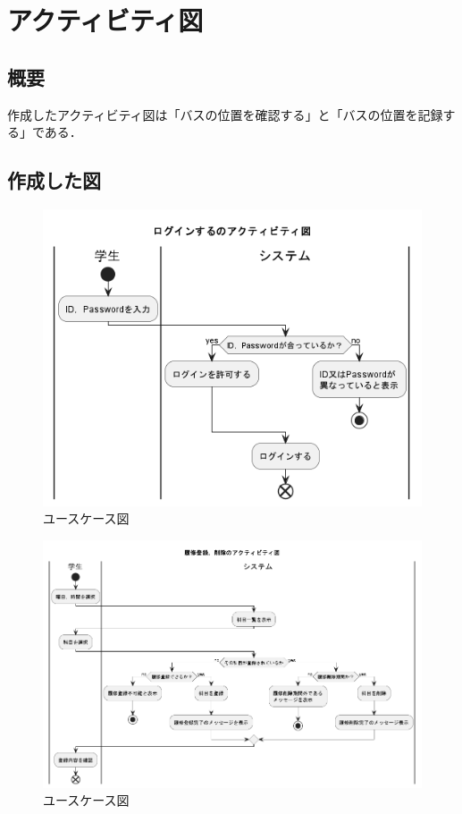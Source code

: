 \documentclass[documentclass]{jsarticle}
\begin{document}
\newpage

\section{アクティビティ図}
\subsection*{概要}
作成したアクティビティ図は「バスの位置を確認する」と「バスの位置を記録する」である．


\subsection*{作成した図}
\begin{figure}[H]
  \begin{center}
    \includegraphics*[scale=0.4]{figure/7-1.png}
  \end{center}
  \caption{ユースケース図}
  \label{fig:7-1}
\end{figure}

\begin{figure}[H]
  \begin{center}
    \includegraphics*[scale=0.4]{figure/7-2.png}
  \end{center}
  \caption{ユースケース図}
  \label{fig:7-2}
\end{figure}
\end{document}

